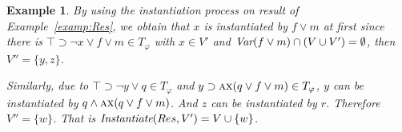 \documentclass{article}
\newtheorem{example}{Example}
\begin{document}
\begin{example}\label{exa:until:sub}
By using the instantiation process on result of Example~\ref{examp:Res}, we obtain that $x$ is instantiated by $f\vee m$ at first since there is $\top \supset \neg x \vee f \vee m \in T_{\varphi}$ with $x \in V'$ and $\textit{Var}(f \vee m) \cap (V\cup V') = \emptyset$, then $V''=\{y,z\}$.

Similarly, due to $\top \supset \neg y \vee q \in T_{\varphi}$ and $y \supset \textsc{a}\textsc{x}(q \vee f\vee m)\in T_{\varphi}$,  $y$ can be instantiated by $q \wedge \textsc{a}\textsc{x}(q \vee f\vee m)$. And $z$ can be instantiated by $r$. Therefore $V''=\{w\}$.
That is $\emph{Instantiate}(Res, V') = V\cup \{w\}$. %
%
%

\end{example}
\end{document}
